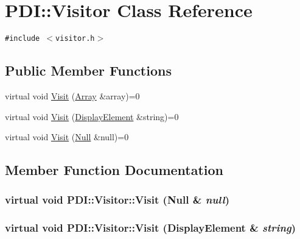 \hypertarget{class_p_d_i_1_1_visitor}{
\section{PDI::Visitor Class Reference}
\label{class_p_d_i_1_1_visitor}
}
{\tt \#include $<$visitor.h$>$}

\subsection*{Public Member Functions}
\begin{CompactItemize}
\item 
virtual void \hyperlink{class_p_d_i_1_1_visitor_dc45ae6e7931b599be5e5e1765a2e349}{Visit} (\hyperlink{class_p_d_i_1_1_array}{Array} \&array)=0
\item 
virtual void \hyperlink{class_p_d_i_1_1_visitor_86acc7579540b5bef83539bc5fc5645c}{Visit} (\hyperlink{class_p_d_i_1_1_display_element}{DisplayElement} \&string)=0
\item 
virtual void \hyperlink{class_p_d_i_1_1_visitor_3ba530a240f0c203c86381f7e1db4775}{Visit} (\hyperlink{class_p_d_i_1_1_null}{Null} \&null)=0
\end{CompactItemize}


\subsection{Member Function Documentation}
\hypertarget{class_p_d_i_1_1_visitor_3ba530a240f0c203c86381f7e1db4775}{
\subsubsection[{Visit}]{\setlength{\rightskip}{0pt plus 5cm}virtual void PDI::Visitor::Visit ({\bf Null} \& {\em null})}}
\label{class_p_d_i_1_1_visitor_3ba530a240f0c203c86381f7e1db4775}


\hypertarget{class_p_d_i_1_1_visitor_86acc7579540b5bef83539bc5fc5645c}{
\subsubsection[{Visit}]{\setlength{\rightskip}{0pt plus 5cm}virtual void PDI::Visitor::Visit ({\bf DisplayElement} \& {\em string})}}
\label{class_p_d_i_1_1_visitor_86acc7579540b5bef83539bc5fc5645c}


